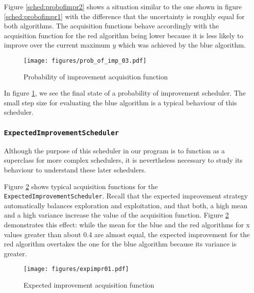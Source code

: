 \documentclass[a4paper,12pt,twoside,openright]{report}
\begin{document}
Figure \ref{sched:probofimpr2} shows a situation similar to the one shown in figure \ref{sched:probofimpr1} with the difference that the uncertainty is roughly equal for both algorithms. The acquisition functions behave accordingly with the acquisition function for the red algorithm being lower because it is less likely to improve over the current maximum $y$ which was achieved by the blue algorithm.

\begin{figure}
\centering
  \texttt{[image: figures/prob\_of\_imp\_03.pdf]}
  \caption{Probability of improvement acquisition function}
  \label{sched:probofimpr3}
\end{figure}

In figure \ref{sched:probofimpr3}, we see the final state of a probability of improvement scheduler. The small step size for evaluating the blue algorithm is a typical behaviour of this scheduler. 

\subsubsection{\texttt{ExpectedImprovementScheduler}}

Although the purpose of this scheduler in our program is to function as a superclass for more complex schedulers, it is nevertheless necessary to study its behaviour to understand these later schedulers.

Figure \ref{sched:expimpr01} shows typical acquisition functions for the \texttt{ExpectedImprovementScheduler}. Recall that the expected improvement strategy automatically balances exploration and exploitation, and that both, a high mean and a high variance increase the value of the acquisition function. Figure \ref{sched:expimpr01} demonstrates this effect: while the mean for the blue and the red algorithms for x values greater than about 0.4 are almost equal, the expected improvement for the red algorithm overtakes the one for the blue algorithm because its variance is greater.

\begin{figure}
\centering
  \texttt{[image: figures/expimpr01.pdf]}
  \caption{Expected improvement acquisition function}
  \label{sched:expimpr01}
\end{figure}
\end{document}
